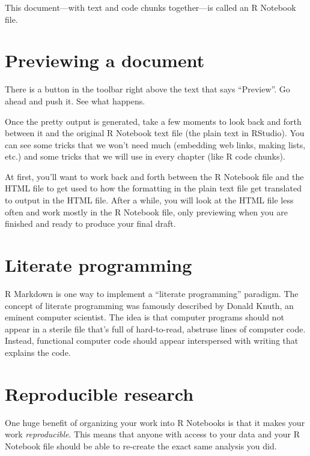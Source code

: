 \documentclass[
]{book}
\begin{document}
This document---with text and code chunks together---is called an R Notebook file.

\hypertarget{rmark-previewing}{%
\section{Previewing a document}\label{rmark-previewing}}

There is a button in the toolbar right above the text that says ``Preview''. Go ahead and push it. See what happens.

Once the pretty output is generated, take a few moments to look back and forth between it and the original R Notebook text file (the plain text in RStudio). You can see some tricks that we won't need much (embedding web links, making lists, etc.) and some tricks that we will use in every chapter (like R code chunks).

At first, you'll want to work back and forth between the R Notebook file and the HTML file to get used to how the formatting in the plain text file get translated to output in the HTML file. After a while, you will look at the HTML file less often and work mostly in the R Notebook file, only previewing when you are finished and ready to produce your final draft.

\hypertarget{rmark-literate}{%
\section{Literate programming}\label{rmark-literate}}

R Markdown is one way to implement a ``literate programming'' paradigm. The concept of literate programming was famously described by Donald Knuth, an eminent computer scientist. The idea is that computer programs should not appear in a sterile file that's full of hard-to-read, abstruse lines of computer code. Instead, functional computer code should appear interspersed with writing that explains the code.

\hypertarget{rmark-reproducible}{%
\section{Reproducible research}\label{rmark-reproducible}}

One huge benefit of organizing your work into R Notebooks is that it makes your work \emph{reproducible}. This means that anyone with access to your data and your R Notebook file should be able to re-create the exact same analysis you did.
\end{document}
